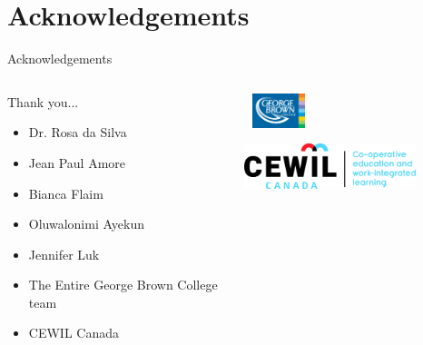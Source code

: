 \documentclass{beamer}
\begin{document}
	\section{Acknowledgements}
	\begin{frame}{Acknowledgements}
		\begin{columns}
			\begin{column}{0.45\textwidth}
				Thank you...
				\begin{itemize}
					\item Dr. Rosa da Silva
					\item Jean Paul Amore
					\item Bianca Flaim
					\item Oluwalonimi Ayekun
					\item Jennifer Luk
					\item The Entire George Brown College team
					\item CEWIL Canada	
				\end{itemize}
			\end{column}
			\begin{column}{0.5\textwidth}
				\centering
				\includegraphics[width=2cm, height=1cm]{gbc.png}	
				\includegraphics[width=5cm, height=2cm]{cewil.jpg}
			\end{column}
		\end{columns}		
		
	
	\end{frame}
\end{document}
